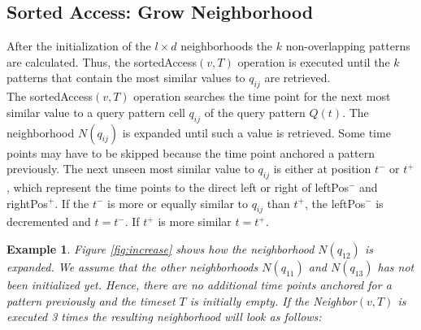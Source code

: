 \documentclass[abstracton,12pt,oneside]{scrreprt}
\newtheorem{example}{Example}
\begin{document}
\subsection{Sorted Access: Grow Neighborhood}
After the initialization of the $l \times d$ neighborhoods the $k$ non-overlapping patterns are calculated. Thus, the sortedAccess$(v, T)$ operation is executed until the $k$ patterns that contain the most similar values to $q_{ij}$ are retrieved.\\
The sortedAccess$(v, T)$ operation searches the time point for the next most similar value to a query pattern cell $q_{ij}$ of the query pattern $Q(t)$. The neighborhood $N(q_{ij})$ is expanded until such a value is retrieved. Some time points may have to be skipped because the time point anchored a pattern previously. The next unseen most similar value to $q_{ij}$ is either at position $t^-$ or $t^+$, which represent the time points to the direct left or right of leftPos$^-$ and rightPos$^+$. If the $t^-$ is more or equally similar to $q_{ij}$ than $t^+$, the leftPos$^-$ is decremented and $t=t^-$. If $t^+$ is more similar $t=t^+$.

\begin{example}
Figure \ref{fig:increase} shows how the neighborhood $N(q_{12})$ is expanded. We assume that the other neighborhoods $N(q_{11})$ and $N(q_{13})$ has not been initialized yet. 
Hence, there are no additional time points anchored for a pattern previously and the timeset $T$ is initially empty. If the Neighbor$(v,T)$ is executed 3 times the resulting neighborhood will look as follows:  
\end{example}
\end{document}

